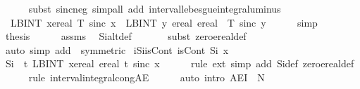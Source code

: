 \documentclass[leqno]{article}
\theoremstyle{definition}
\begin{document}
\begin{isabellebody}
\ \ \ \ \isamarkupfalse%
\ {\isacharparenleft}subst\ sinc{\isacharunderscore}neg{\isacharparenright}\ {\isacharparenleft}simp{\isacharunderscore}all\ add{\isacharcolon}\ interval{\isacharunderscore}lebesgue{\isacharunderscore}integral{\isacharunderscore}uminus{\isacharparenright}\isanewline
\ \ \isamarkupfalse%
\ \isamarkupfalse%
\ {\isacharasterisk}{\isacharcolon}\ {\isachardoublequoteopen}{\isacharminus}{\isacharparenleft}LBINT\ x{\isacharequal}ereal\ {}{\isachardot}{\isachardot}T{\isachardot}\ sinc\ x{\isacharparenright}\ {\isacharequal}\ LBINT\ y{\isacharequal}\ ereal\ {}{\isachardot}{\isachardot}ereal\ {\isacharparenleft}{\isacharminus}\ T{\isacharparenright}{\isachardot}\ sinc\ y{\isachardoublequoteclose}\isanewline
\ \ \ \ \isamarkupfalse%
\ simp\isanewline
\ \ \isamarkupfalse%
\ {\isacharquery}thesis\isanewline
\ \ \ \ \isamarkupfalse%
\ assms\ \isamarkupfalse%
\ Si{\isacharunderscore}alt{\isacharunderscore}def\isanewline
\ \ \ \ \ \isamarkupfalse%
\ {\isacharparenleft}subst\ zero{\isacharunderscore}ereal{\isacharunderscore}def{\isacharparenright}{\isacharplus}\isanewline
\ \ \ \ \ \isamarkupfalse%
\ {\isacharparenleft}auto\ simp\ add{\isacharcolon}\ {\isacharasterisk}\ {\isacharbrackleft}symmetric{\isacharbrackright}{\isacharparenright}\isanewline
{}\isamarkupfalse%
\isanewline
\isanewline
{}\isamarkupfalse%
\ iSi{\isacharunderscore}isCont{\isacharcolon}\ {\isachardoublequoteopen}isCont\ Si\ x{\isachardoublequoteclose}\isanewline
{}\isamarkupfalse%
\ {\isacharminus}\isanewline
\ \ \isamarkupfalse%
\ {\isachardoublequoteopen}Si\ {\isacharequal}\ {\isacharparenleft}{\isasymlambda}t{\isachardot}\ LBINT\ x{\isacharequal}ereal\ {}{\isachardot}{\isachardot}ereal\ t{\isachardot}\ sinc\ x{\isacharparenright}{\isachardoublequoteclose}\isanewline
\ \ \ \ \isamarkupfalse%
\ {\isacharparenleft}rule\ ext{\isacharcomma}\ simp\ add{\isacharcolon}\ Si{\isacharunderscore}def\ zero{\isacharunderscore}ereal{\isacharunderscore}def{\isacharparenright}\isanewline
\ \ \ \ \isamarkupfalse%
\ {\isacharparenleft}rule\ interval{\isacharunderscore}integral{\isacharunderscore}cong{\isacharunderscore}AE{\isacharparenright}\isanewline
\ \ \ \ \isamarkupfalse%
\ {\isacharparenleft}auto\ intro{\isacharbang}{\isacharcolon}\ AE{\isacharunderscore}I{\isacharprime}\ {\isacharbrackleft}\ N\ {\isacharequal}\ {\isachardoublequoteopen}{\isacharbraceleft}{}{\isacharbraceright}{\isachardoublequoteclose}{\isacharbrackright}{\isacharparenright}\isanewline

\end{isabellebody}
\end{document}
